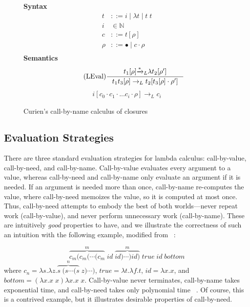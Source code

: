 \begin{figure}
\textbf{Syntax}
\begin{align*}
\tag{Term} t &::= i \; | \; \lambda t \; | \; t \; t  \\
\tag{Variable} i &\in \mathbb{N}  \\
\tag{Closure} c &::= t [\rho] \\
\tag{Environment} \rho &::= \bullet \; | \; c \cdot \rho \\
\end{align*}
\textbf{Semantics}
\begin{align*}
\tag{LEval}\inference
{t_1[\rho] {\xrightarrow{* }}_L \lambda t_2[\rho'] }
{t_1 t_3[\rho] \rightarrow_L t_2[t_3[\rho] \cdot \rho'] } 
\end{align*}
\begin{align*}
\tag{LVar} i [c_0 \cdot c_1 \cdot ... c_i \cdot \rho] \rightarrow_L c_i
\end{align*}
\caption{Curien's call-by-name calculus of closures ~\cite{curien1991abstract}}
\label{fig:calcclos}
\end{figure}

\subsection{Evaluation Strategies} \label{sec:eval}

There are three standard evaluation strategies for lambda calculus:
call-by-value, call-by-need, and call-by-name.  Call-by-value evaluates every argument
to a value, whereas call-by-need and call-by-name only evaluate an argument if
it is needed.  If an argument is needed more than once, call-by-name re-computes
the value, where call-by-need memoizes the value, so it is computed at most once.
Thus, call-by-need attempts to embody the best of both worlds---never repeat
work (call-by-value), and never perform unnecessary work (call-by-name). These
are intuitively \emph{good} properties to have, and we illustrate the
correctness of such an intuition with the following example, modified from
~\cite{danvy2013synthetic}:

$$ \overbrace{c_m (c_m (\cdots(c_m}^{m} \; id \; \overbrace{id)\cdots) id)}^{m} \; true \; id
\; bottom $$ where $c_n = \lambda s.\lambda z.\overbrace{s \; (s \cdots (s}^{n}
\; z) \cdots) $, $true = \lambda t.\lambda f.t$, $id=\lambda x.x$, and $bottom =
(\lambda x.x \; x) \lambda x.x \; x$. Call-by-value never terminates,
call-by-name takes exponential time, and call-by-need takes only polynomial time
~\cite{danvy2013synthetic}. Of course, this is a contrived example, but it
illustrates desirable properties of call-by-need.

